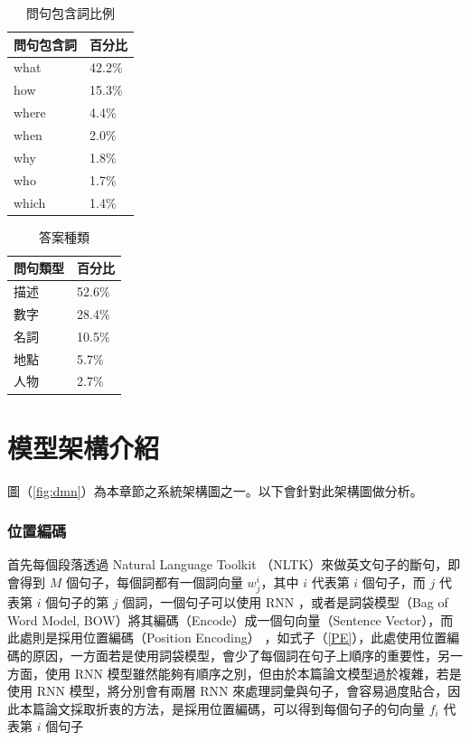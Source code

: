 \begin{table}
    \caption{問句包含詞比例}
    \label{table:query_percentage}
    \centering
    \begin{tabular}[h]{|l|l|}
        \hline
        問句包含詞  &百分比\\
        \hline
        what        &42.2\%\\
        \hline
        how         &15.3\%\\
        \hline
        where       &4.4\%\\
        \hline
        when        &2.0\%\\
        \hline
        why         &1.8\%\\
        \hline
        who         &1.7\%\\
        \hline
        which       &1.4\%\\
        \hline
    \end{tabular}
\end{table}

\begin{table}
    \caption{答案種類}
    \label{table:query_type}
    \centering
    \begin{tabular}{|l|l|}
        \hline
        問句類型            &百分比\\
        \hline
        描述 &52.6\%\\
        \hline
        數字    &28.4\%\\
        \hline
        名詞      &10.5\%\\
        \hline
        地點    &5.7\%\\
        \hline
        人物      &2.7\%\\
        \hline
    \end{tabular}
\end{table}

\section{模型架構介紹}
圖（\ref{fig:dmn}）為本章節之系統架構圖之一。以下會針對此架構圖做分析。

\subsubsection{位置編碼}
首先每個段落透過 Natural Language Toolkit （NLTK）來做英文句子的斷句，即會得到 $M$ 個句子，每個詞都有一個詞向量 $w_j^i$，其中 $i$ 代表第 $i$ 個句子，而 $j$ 代表第 $i$ 個句子的第 $j$ 個詞，一個句子可以使用 RNN ，或者是詞袋模型（Bag of Word Model, BOW）將其編碼（Encode）成一個句向量（Sentence Vector），而此處則是採用位置編碼（Position Encoding）\cite{sukhbaatar2015end}  ，如式子（\ref{PE}），此處使用位置編碼的原因，一方面若是使用詞袋模型，會少了每個詞在句子上順序的重要性，另一方面，使用 RNN 模型雖然能夠有順序之別，但由於本篇論文模型過於複雜，若是使用 RNN 模型，將分別會有兩層 RNN 來處理詞彙與句子，會容易過度貼合，因此本篇論文採取折衷的方法，是採用位置編碼，可以得到每個句子的句向量 $f_i$ 代表第 $i$ 個句子

